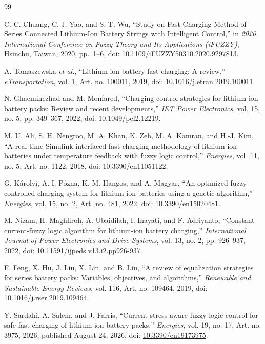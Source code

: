 \documentclass[a4paper,10pt,twocolumn]{article}
\begin{document}
\begin{thebibliography}{99}
\raggedright
\small
\setlength{\itemsep}{3pt}

C.-C. Chuang, C.-J. Yao, and S.-T. Wu,
``Study on Fast Charging Method of Series Connected Lithium-Ion Battery Strings with Intelligent Control,''
in \textit{2020 International Conference on Fuzzy Theory and Its Applications (iFUZZY)}, Hsinchu, Taiwan, 2020, pp.~1--6, doi: \href{https://doi.org/10.1109/iFUZZY50310.2020.9297813}{10.1109/iFUZZY50310.2020.9297813}.


A. Tomaszewska \textit{et al.},
``Lithium-ion battery fast charging: A review,''
\textit{eTransportation},
vol. 1, Art. no. 100011, 2019,
doi: 10.1016/j.etran.2019.100011.

N. Ghaeminezhad and M. Monfared,
``Charging control strategies for lithium-ion
battery packs: Review and recent developments,''
\textit{IET Power Electronics},
vol. 15, no. 5, pp. 349--367, 2022,
doi: 10.1049/pel2.12219.

M. U. Ali, S. H. Nengroo, M. A. Khan,
K. Zeb, M. A. Kamran, and H.-J. Kim,
``A real-time Simulink interfaced fast-charging
methodology of lithium-ion batteries under
temperature feedback with fuzzy logic control,''
\textit{Energies},
vol. 11, no. 5, Art. no. 1122, 2018,
doi: 10.3390/en11051122.

G. Károlyi, A. I. Pózna, K. M. Hangos,
and A. Magyar,
``An optimized fuzzy controlled charging system
for lithium-ion batteries using a genetic
algorithm,''
\textit{Energies},
vol. 15, no. 2, Art. no. 481, 2022,
doi: 10.3390/en15020481.

M. Nizam, H. Maghfiroh, A. Ubaidilah,
I. Inayati, and F. Adriyanto,
``Constant current-fuzzy logic algorithm
for lithium-ion battery charging,''
\textit{International Journal of Power
Electronics and Drive Systems},
vol. 13, no. 2, pp. 926--937, 2022,
doi: 10.11591/ijpeds.v13.i2.pp926-937.

F. Feng, X. Hu, J. Liu, X. Lin, and B. Liu,
``A review of equalization strategies for
series battery packs: Variables, objectives,
and algorithms,''
\textit{Renewable and Sustainable Energy Reviews},
vol. 116, Art. no. 109464, 2019,
doi: 10.1016/j.rser.2019.109464.

\balance
{}
Y. Sardahi, A. Salem, and J. Farris,
``Current-stress-aware fuzzy logic control
for safe fast charging of lithium-ion
battery packs,''
\textit{Energies},
vol. 19, no. 17, Art. no. 3975, 2026,
published August 24, 2026, doi: \href{https://doi.org/10.3390/en19173975}{10.3390/en19173975}.


\end{thebibliography}
\end{document}
